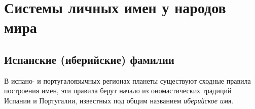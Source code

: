 \chapter*{Системы личных имен у народов мира}

\section*{Испанские (иберийские) фамилии}

В испано- и португалоязычных регионах планеты существуют сходные правила построения имен, эти правила берут начало из ономастических традиций Испании и Португалии, известных под общим названием \textit{иберийское имя}.

